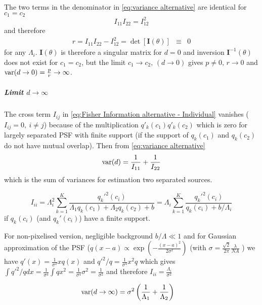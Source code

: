 The two terms in the denominator in \autoref{eq:variance alternative} are identical for $c_1=c_2$
\begin{equation}
	I_{11}I_{22}=I_{12}^2
\end{equation}
%
and therefore 
%
\begin{eqnarray*}
	r=I_{11}I_{22}-I_{12}^2=\det\left[\bm{I}(\theta)\right] & \equiv & 0
\end{eqnarray*}
%
for any $\Lambda_i$. $\bm{I}(\theta)$ is therefore a singular matrix for $d=0$ and inversion $\bm{I}^{-1}(\theta)$ does not exist for $c_1=c_2$, but the limit $c_1\rightarrow c_2,\,(d\rightarrow0)$ gives $p\neq0,\, r\rightarrow0$ and $\mathrm{var}(d\rightarrow0)=\frac{p}{r}\rightarrow\infty$. 

\subparagraph*{Limit $d\rightarrow\infty$}
The cross term $I_{ij}$ in \autoref{eq:Fisher Information alternative - Individual} vanishes ($I_{ij}=0,\: i\neq j$) because of the multiplication $q'_k(c_1)q'_k(c_2)$ which is zero for largely separated PSF with finite support (if the support of $q_k(c_1)$ and $q_k(c_2)$ do not have mutual overlap). Then from \autoref{eq:variance alternative} 
%
\begin{equation}
	\mathrm{var}(d)=\frac{1}{I_{11}}+\frac{1}{I_{22}}
\end{equation}
%
which is the sum of variances for estimation two separated sources.

\begin{equation}
	I_{ii}=\Lambda_i^2\sum_{k=1}^K\frac{q_k'^2(c_i)}{\Lambda_1q_k(c_1)+\Lambda_2q_k(c_2)+b}=\Lambda_i\sum_{k=1}^K\frac{q_k'^2(c_i)}{q_k(c_i)+b/\Lambda_i}
\end{equation}
%
if $q_k(c_i)$ (and $q_k'(c_i)$) have a finite support.

For non-pixelised version, negligible background $b/\Lambda\ll1$ and for Gaussian approximation of the PSF ($q(x-a)\propto\exp\left(-\frac{(x-a)^2}{2\sigma^2}\right)$ (with
$\sigma=\frac{\sqrt{2}}{2\pi}\frac{\lambda}{NA}$ \cite{Zhang2007}) we have $q'(x)=\frac{1}{\sigma^2}xq(x)$ and $q'^2/q=\frac{1}{\sigma^4}x^2q$ which gives $\int q'^2/qdx=\frac{1}{\sigma^4}\int qx^2=\frac{1}{\sigma^4}\sigma^2=\frac{1}{\sigma^2}$ and therefore $I_{ii}=\frac{\Lambda_i}{\sigma^2}$ 

\begin{alignat*}{1}
	\mathrm{var}(d\rightarrow\infty) & =\sigma^2\left(\frac{1}{\Lambda_1}+\frac{1}{\Lambda_2}\right)
\end{alignat*}

